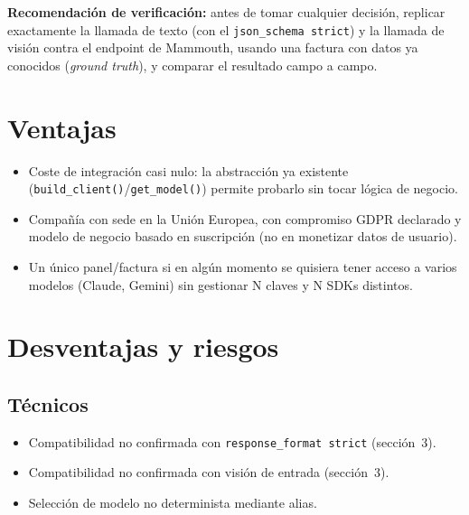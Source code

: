 \documentclass[11pt,a4paper]{article}
\begin{document}
\textbf{Recomendación de verificación:} antes de tomar cualquier decisión, replicar
exactamente la llamada de texto (con el \texttt{json\_schema strict}) y la llamada
de visión contra el endpoint de Mammouth, usando una factura con datos ya
conocidos (\emph{ground truth}), y comparar el resultado campo a campo.

\section{Ventajas}

\begin{itemize}
    \item Coste de integración casi nulo: la abstracción ya existente
    (\texttt{build\_client()}/\texttt{get\_model()}) permite probarlo sin tocar
    lógica de negocio.
    \item Compañía con sede en la Unión Europea, con compromiso GDPR declarado y
    modelo de negocio basado en suscripción (no en monetizar datos de usuario).
    \item Un único panel/factura si en algún momento se quisiera tener acceso a
    varios modelos (Claude, Gemini) sin gestionar N claves y N SDKs distintos.
\end{itemize}

\section{Desventajas y riesgos}

\subsection{Técnicos}
\begin{itemize}
    \item Compatibilidad no confirmada con \texttt{response\_format strict} (sección~3).
    \item Compatibilidad no confirmada con visión de entrada (sección~3).
    \item Selección de modelo no determinista mediante alias.
\end{itemize}
\end{document}
